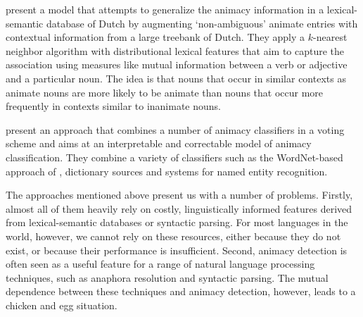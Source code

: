 \documentclass[a4paper,UKenglish]{oasics}
\begin{document}
\cite{bloem:13} present a model that attempts to generalize the
animacy information in a lexical-semantic database of Dutch by
augmenting `non-ambiguous' animate entries with contextual information
from a large treebank of Dutch. They apply a $k$-nearest neighbor
algorithm with distributional lexical features that aim to capture the
association using measures like mutual information between a verb or
adjective and a particular noun. The idea is that nouns that occur in
similar contexts as animate nouns are more likely to be animate than
nouns that occur more frequently in contexts similar to inanimate nouns.

\cite{moore:13} present an approach that combines a number of animacy
classifiers in a voting scheme and aims at an interpretable and
correctable model of animacy classification. They combine a variety of
classifiers such as the WordNet-based approach of \cite{evans:00},
dictionary sources and systems for named entity recognition.

The approaches mentioned above present us with a number of
problems. Firstly, almost all of them heavily rely on costly,
linguistically informed features derived from lexical-semantic
databases or syntactic parsing. For most languages in the world,
however, we cannot rely on these resources, either because they do not
exist, or because their performance is insufficient.  Second, animacy
detection is often seen as a useful feature for a range of natural
language processing techniques, such as anaphora resolution and
syntactic parsing. The mutual dependence between these techniques and
animacy detection, however, leads to a chicken and egg
situation.
\end{document}
